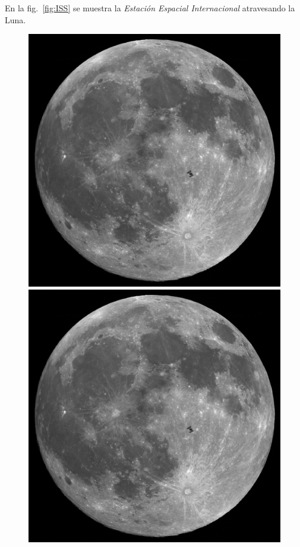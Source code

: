 \documentclass[12pt, letter]{exam}
\begin{document}
\begin{questions}

\begin{mdframed}[style=mystyle]
\vspace{0.5cm}
En la fig.\ \ref{fig:ISS} se muestra la \textit{Estación Espacial Internacional} atravesando la Luna.

\begin{figure}[H]
\centering
\includegraphics[scale=0.4]{ISS_moon}
\includegraphics[scale=0.2]{ISS_moon}

\end{figure}
\end{mdframed}
\end{questions}
\end{document}
